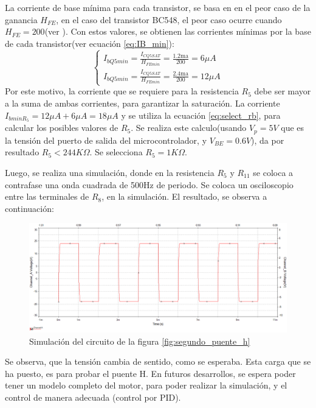 La corriente de base mínima para cada transistor, se basa en en el peor caso de la ganancia $H_{FE}$, en el caso del transistor BC548, el peor caso ocurre cuando $H_{FE} = 200$(ver \cite{BC548}). Con estos valores, se obtienen las corrientes mínimas por la base de cada transistor(ver ecuación \ref{eq:IB_min}): 
\begin{equation}
	\begin{cases}
		I_{bQ5min} = \frac{I_{CQ5SAT}}{H_{FEmin}} = \frac{1.2\text{ma}}{200} = 6\mu A  \\
		I_{bQ5min} = \frac{I_{CQ5SAT}}{H_{FEmin}} = \frac{2.4\text{ma}}{200} = 12\mu A 
	\end{cases}
\end{equation}
Por este motivo, la corriente que se requiere para la resistencia $R_5$ debe ser mayor a la suma de ambas corrientes, para garantizar la saturación. La corriente $I_{bminR_5} = 12\mu A + 6\mu A = 18\mu A $ y se utiliza la ecuación \ref{eq:select_rb}, para calcular los posibles valores de $R_5$. Se realiza este calculo(usando $V_{p}=5V$ que es la tensión del puerto de salida del microcontrolador, y $V_{BE}=0.6V$), da por resultado $R_5<244K\Omega$. Se selecciona $R_5=1K\Omega$. 

Luego, se realiza una simulación, donde en la resistencia $R_5$ y $R_{11}$ se coloca a contrafase una onda cuadrada de 500Hz de periodo. Se coloca un osciloscopio entre las terminales de $R_8$, en la simulación. El resultado, se observa a continuación: 
\begin{figure}[ht]
	\includegraphics[scale=0.5]{simulacion_puente_2}
	\caption{Simulación del circuito de la figura \ref{fig:segundo_puente_h}}
\end{figure}

Se observa, que la tensión cambia de sentido, como se esperaba. Esta carga que se ha puesto, es para probar el puente H. En futuros desarrollos, se espera poder tener un modelo completo del motor, para poder realizar la simulación, y el control de manera adecuada (control por PID). 

